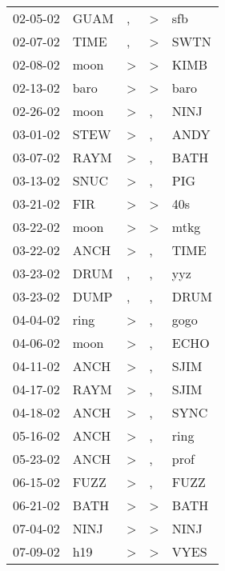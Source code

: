 \begin{supertabular}{lllll}
 02-05-02 &   GUAM &                , &     \textgreater &    sfb \\
 02-07-02 &   TIME &                , &     \textgreater &   SWTN \\
 02-08-02 &   moon &     \textgreater &     \textgreater &   KIMB \\
 02-13-02 &   baro &     \textgreater &     \textgreater &   baro \\
 02-26-02 &   moon &     \textgreater &                , &   NINJ \\
 03-01-02 &   STEW &     \textgreater &                , &   ANDY \\
 03-07-02 &   RAYM &     \textgreater &                , &   BATH \\
 03-13-02 &   SNUC &     \textgreater &                , &    PIG \\
 03-21-02 &    FIR &     \textgreater &     \textgreater &    40s \\
 03-22-02 &   moon &     \textgreater &     \textgreater &   mtkg \\
 03-22-02 &   ANCH &     \textgreater &                , &   TIME \\
 03-23-02 &   DRUM &                , &                , &    yyz \\
 03-23-02 &   DUMP &                , &                , &   DRUM \\
 04-04-02 &   ring &     \textgreater &                , &   gogo \\
 04-06-02 &   moon &     \textgreater &                , &   ECHO \\
 04-11-02 &   ANCH &     \textgreater &                , &   SJIM \\
 04-17-02 &   RAYM &     \textgreater &                , &   SJIM \\
 04-18-02 &   ANCH &     \textgreater &                , &   SYNC \\
 05-16-02 &   ANCH &     \textgreater &                , &   ring \\
 05-23-02 &   ANCH &     \textgreater &                , &   prof \\
 06-15-02 &   FUZZ &     \textgreater &                , &   FUZZ \\
 06-21-02 &   BATH &     \textgreater &     \textgreater &   BATH \\
 07-04-02 &   NINJ &     \textgreater &     \textgreater &   NINJ \\
 07-09-02 &    h19 &     \textgreater &     \textgreater &   VYES \\

\end{supertabular}
